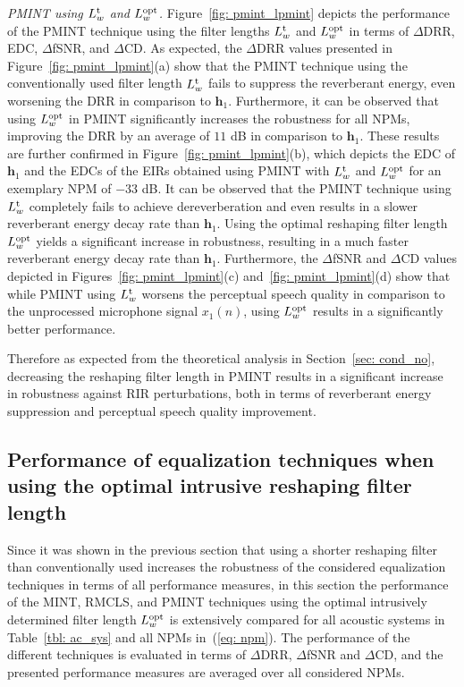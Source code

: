 \documentclass[twocolumn]{bmcart}%
\begin{document}
\emph{PMINT using $L^{\rm t}_w$ and $L_w^{\rm opt}$.} \enspace Figure~\ref{fig: pmint_lpmint} depicts the performance of the PMINT technique using the filter lengths $L^{\rm t}_w$ and $L_w^{\rm opt}$ in terms of $\Delta$DRR, EDC, $\Delta$fSNR, and $\Delta$CD.
As expected, the $\Delta$DRR values presented in Figure~\ref{fig: pmint_lpmint}(a) show that the PMINT technique using the conventionally used filter length $L^{\rm t}_w$ fails to suppress the reverberant energy, even worsening the DRR in comparison to $\mathbf{h}_1$.
Furthermore, it can be observed that using $L^{\rm opt}_w$ in PMINT significantly increases the robustness for all NPMs, improving the DRR by an average of $11$ dB in comparison to $\mathbf{h}_1$.
These results are further confirmed in Figure~\ref{fig: pmint_lpmint}(b), which depicts the EDC of $\mathbf{h}_1$ and the EDCs of the EIRs obtained using PMINT with $L^{\rm t}_w$ and $L^{\rm opt}_w$ for an exemplary NPM of $-33$ dB.
It can be observed that the PMINT technique using $L^{\rm t}_w$ completely fails to achieve dereverberation and even results in a slower reverberant energy decay rate than $\mathbf{h}_1$.
Using the optimal reshaping filter length $L^{\rm opt}_w$ yields a significant increase in robustness, resulting in a much faster reverberant energy decay rate than $\mathbf{h}_1$.
Furthermore, the $\Delta$fSNR and $\Delta$CD values depicted in Figures~\ref{fig: pmint_lpmint}(c) and~\ref{fig: pmint_lpmint}(d) show that while PMINT using $L^{\rm t}_w$ worsens the perceptual speech quality in comparison to the unprocessed microphone signal $x_1(n)$, using $L^{\rm opt}_w$ results in a significantly better performance.

Therefore as expected from the theoretical analysis in Section~\ref{sec: cond_no}, decreasing the reshaping filter length in PMINT results in a significant increase in robustness against RIR perturbations, both in terms of reverberant energy suppression and perceptual speech quality improvement.


\subsection{Performance of equalization techniques when using the optimal intrusive reshaping filter length}
\label{sec: lcomp}
Since it was shown in the previous section that using a shorter reshaping filter than conventionally used increases the robustness of the considered equalization techniques in terms of all performance measures, in this section the performance of the MINT, RMCLS, and PMINT techniques using the optimal intrusively determined filter length $L^{\rm opt}_w$ is extensively compared for all acoustic systems in Table~\ref{tbl: ac_sys} and all NPMs in~(\ref{eq: npm}).
The performance of the different techniques is evaluated in terms of $\Delta$DRR, $\Delta$fSNR and $\Delta$CD, and the presented performance measures are averaged over all considered NPMs.
\end{document}
